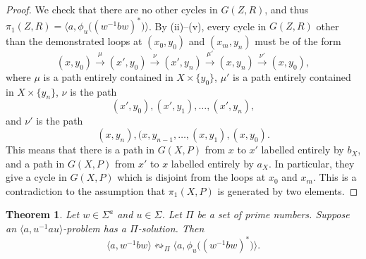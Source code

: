 \documentclass[10pt,a4paper]{amsart}
\newtheorem{theorem}{Theorem}[section]
\theoremstyle{definition}
\theoremstyle{definition}
\numberwithin{equation}{section}
\begin{document}
\begin{proof}
We check that there are no other cycles in $G(Z, R)$, and thus $\pi_1(Z, R)=\big\langle a, \phi_u\big((w^{-1}bw)^*\big)\big\rangle$. By (ii)--(v), every cycle in $G(Z, R)$ other than the demonstrated loops at $(x_0, y_0)$ and $(x_m, y_n)$ must be of the form 
$$ (x, y_0)\stackrel{\mu}{\longrightarrow}(x',y_0)\stackrel{\nu}{\longrightarrow}(x', y_n)\stackrel{\mu'}{\longrightarrow}(x, y_n)\stackrel{\nu'}{\longrightarrow}(x, y_0), $$
where $\mu$ is a path entirely contained in $X\times\{y_0\}$, $\mu'$ is a path entirely contained in $X\times \{y_n\}$, $\nu$ is the path 
$$ (x', y_0), (x', y_1), \dots, (x', y_n), $$
and $\nu'$ is the path
$$ (x, y_n), (x, y_{n-1}, \dots, (x, y_1), (x, y_0). $$
This means that there is a path in $G(X,P)$ from $x$ to $x'$ labelled entirely by $b_X$, and a path in $G(X,P)$ from $x'$ to $x$ labelled entirely by $a_X$. In particular, they give a cycle in $G(X,P)$ which is disjoint from the loops at $x_0$ and $x_m$. This is a contradiction to the assumption that $\pi_1(X, P)$ is generated by two elements.
\end{proof}


\begin{theorem}\label{thm:stationary} Let $w\in \Sigma^a$ and $u\in \Sigma$. Let $\Pi$ be a set of prime numbers. Suppose an $\langle a, u^{-1}au\rangle$-problem has a $\Pi$-solution. Then
$$\langle a, w^{-1}bw\rangle \leftrightsquigarrow_{\Pi} \big\langle a, \phi_u\big((w^{-1}bw)^*\big)\big\rangle.$$
\end{theorem}
\end{document}

